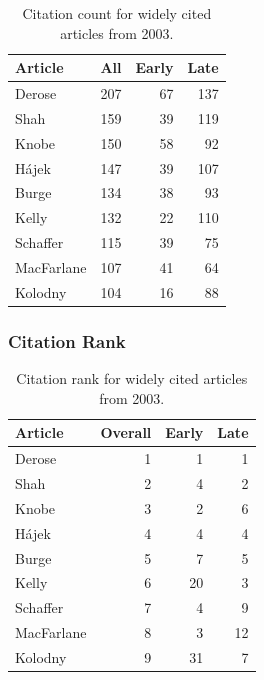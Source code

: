 \documentclass[
  10pt,
  letterpaper,
  DIV=11,
  numbers=noendperiod,
  twoside]{scrartcl}
\begin{document}
\begin{longtable}[]{@{}lrrr@{}}

\caption{\label{tbl-citation-count-2003}Citation count for widely cited
articles from 2003.}

\tabularnewline

\toprule\noalign{}
Article & All & Early & Late \\
\midrule\noalign{}
\endhead
\bottomrule\noalign{}
\endlastfoot
Derose & 207 & 67 & 137 \\
Shah & 159 & 39 & 119 \\
Knobe & 150 & 58 & 92 \\
Hájek & 147 & 39 & 107 \\
Burge & 134 & 38 & 93 \\
Kelly & 132 & 22 & 110 \\
Schaffer & 115 & 39 & 75 \\
MacFarlane & 107 & 41 & 64 \\
Kolodny & 104 & 16 & 88 \\

\end{longtable}

\subsubsection*{Citation Rank}\label{sec-rank-2003}

\begin{longtable}[]{@{}lrrr@{}}

\caption{\label{tbl-citation-rank-2003}Citation rank for widely cited
articles from 2003.}

\tabularnewline

\toprule\noalign{}
Article & Overall & Early & Late \\
\midrule\noalign{}
\endhead
\bottomrule\noalign{}
\endlastfoot
Derose & 1 & 1 & 1 \\
Shah & 2 & 4 & 2 \\
Knobe & 3 & 2 & 6 \\
Hájek & 4 & 4 & 4 \\
Burge & 5 & 7 & 5 \\
Kelly & 6 & 20 & 3 \\
Schaffer & 7 & 4 & 9 \\
MacFarlane & 8 & 3 & 12 \\
Kolodny & 9 & 31 & 7 \\

\end{longtable}
\end{document}
